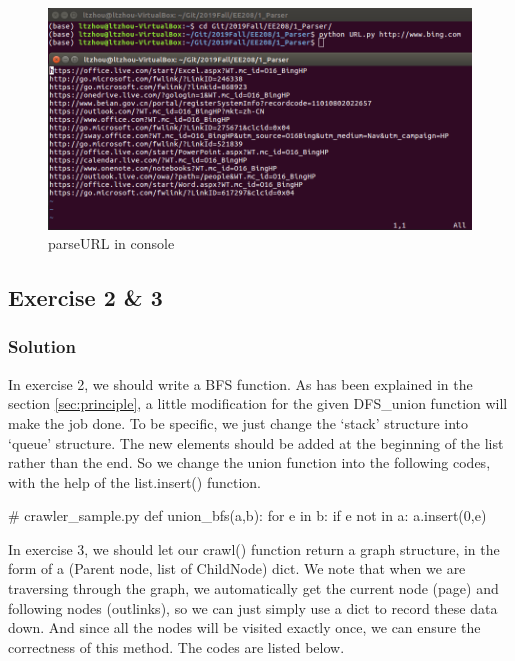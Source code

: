 \documentclass{article}
\begin{document}
\begin{figure}[htbp]
\centering
\includegraphics[width=13.5cm]{img/test1_2.png}
\caption{parseURL in console}
\label{img:1.2}
\end{figure}

\subsection{Exercise 2 \& 3}

\subsubsection{Solution}

In exercise 2, we should write a BFS function. As has been explained in the section \ref{sec:principle}, a little modification for the given DFS\_union function will make the job done. To be specific, we just change the `stack' structure into `queue' structure. The new elements should be added at the beginning of the list rather than the end. So we change the union function into the following codes, with the help of the list.insert() function. 

\begin{python}
# crawler_sample.py
def union_bfs(a,b):
    for e in b:
        if e not in a:
            a.insert(0,e)
\end{python}

In exercise 3, we should let our crawl() function return a graph structure, in the form of a (Parent node, list of ChildNode) dict. We note that when we are traversing through the graph, we automatically get the current node (page) and following nodes (outlinks), so we can just simply use a dict to record these data down. And since all the nodes will be visited exactly once, we can ensure the correctness of this method. The codes are listed below.
\end{document}
